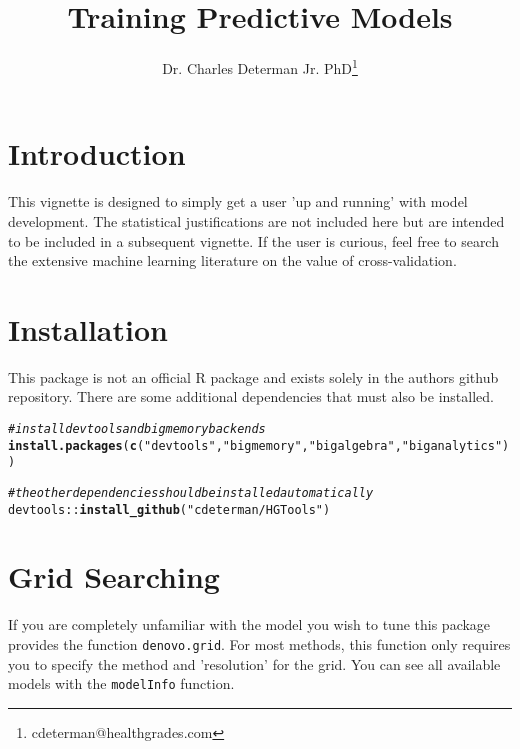 \documentclass[12pt]{article}\usepackage[]{graphicx}\usepackage[]{color}
\makeatletter
\newcommand{\hlstr}[1]{\textcolor[rgb]{0.192,0.494,0.8}{#1}}%
\newcommand{\hlcom}[1]{\textcolor[rgb]{0.678,0.584,0.686}{\textit{#1}}}%
\newcommand{\hlopt}[1]{\textcolor[rgb]{0,0,0}{#1}}%
\newcommand{\hlstd}[1]{\textcolor[rgb]{0.345,0.345,0.345}{#1}}%
\newcommand{\hlkwd}[1]{\textcolor[rgb]{0.737,0.353,0.396}{\textbf{#1}}}%
\newenvironment{kframe}{%
 \def\at@end@of@kframe{}%
 \ifinner\ifhmode%
  \def\at@end@of@kframe{\end{minipage}}%
  \begin{minipage}{\columnwidth}%
 \fi\fi%
 \def\FrameCommand##1{\hskip\@totalleftmargin \hskip-\fboxsep
 \colorbox{shadecolor}{##1}\hskip-\fboxsep
     \hskip-\linewidth \hskip-\@totalleftmargin \hskip\columnwidth}%
 \MakeFramed {\advance\hsize-\width
   \@totalleftmargin\z@ \linewidth\hsize
   \@setminipage}}%
 {\par\unskip\endMakeFramed%
 \at@end@of@kframe}
\newenvironment{knitrout}{}{} %
\newcommand{\Rcode}[1]{\texttt{#1}}
\newcommand{\Rfunction}[1]{\Rcode{#1}}
\makeatother
\begin{document}
\title{Training Predictive Models}
\author{Dr. Charles Determan Jr. PhD\footnote{cdeterman@healthgrades.com}}
\newpage

\maketitle
\section{Introduction}
This vignette is designed to simply get a user 'up and running' with model
development.  The statistical justifications are not included here but are intended to
be included in a subsequent vignette.  If the user is curious, feel free to search
the extensive machine learning literature on the value of cross-validation.

\maketitle
\section{Installation}
This package is not an official R package and exists solely in the authors github repository.
There are some additional dependencies that must also be installed.

\begin{knitrout}
\color{fgcolor}\begin{kframe}
\begin{alltt}
\hlcom{# install devtools and bigmemory backends}
\hlkwd{install.packages}\hlstd{(}\hlkwd{c}\hlstd{(}\hlstr{"devtools"}\hlstd{,}\hlstr{"bigmemory"}\hlstd{,} \hlstr{"bigalgebra"}\hlstd{,} \hlstr{"biganalytics"}\hlstd{))}

\hlcom{# the other dependencies should be installed automatically}
\hlstd{devtools}\hlopt{::}\hlkwd{install_github}\hlstd{(}\hlstr{"cdeterman/HGTools"}\hlstd{)}
\end{alltt}
\end{kframe}
\end{knitrout}

\newpage
\maketitle
\section{Grid Searching}
If you are completely unfamiliar with the model you wish to tune this package provides the 
function \Rfunction{denovo.grid}.  For most methods, this function only requires you to
specify the method and 'resolution' for the grid.  You can see all available models with the
\Rfunction{modelInfo} function.
\end{document}
